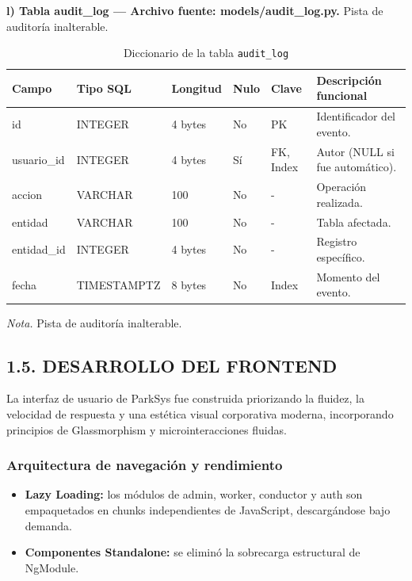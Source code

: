 \textbf{l) Tabla audit\_log — Archivo fuente: models/audit\_log.py.} Pista de auditoría inalterable.

\begin{table}[htbp]
\caption{Diccionario de la tabla \texttt{audit\_log}}
\label{tab:dict_audit_log}
\begin{tabular}{@{}p{4cm} p{3cm} p{1.5cm} p{1cm} p{1.5cm} p{4cm}@{}}
\toprule
\textbf{Campo} & \textbf{Tipo SQL} & \textbf{Longitud} & \textbf{Nulo} & \textbf{Clave} & \textbf{Descripción funcional} \\
\midrule
id & INTEGER & 4 bytes & No & PK & Identificador del evento. \\
usuario\_id & INTEGER & 4 bytes & Sí & FK, Index & Autor (NULL si fue automático). \\
accion & VARCHAR & 100 & No & - & Operación realizada. \\
entidad & VARCHAR & 100 & No & - & Tabla afectada. \\
entidad\_id & INTEGER & 4 bytes & No & - & Registro específico. \\
fecha & TIMESTAMPTZ & 8 bytes & No & Index & Momento del evento. \\
\bottomrule
\end{tabular}
\par\vspace{0.2cm}
\textit{Nota.} Pista de auditoría inalterable.
\end{table}

\newpage\subsection{1.5. DESARROLLO DEL FRONTEND}



La interfaz de usuario de ParkSys fue construida priorizando la fluidez, la velocidad de respuesta y una estética visual corporativa moderna, incorporando principios de Glassmorphism y microinteracciones fluidas.

\subsubsection{Arquitectura de navegación y rendimiento}



\begin{itemize}
    \item \textbf{Lazy Loading:} los módulos de admin, worker, conductor y auth son empaquetados en chunks independientes de JavaScript, descargándose bajo demanda.
    \item \textbf{Componentes Standalone:} se eliminó la sobrecarga estructural de NgModule.
\end{itemize}

